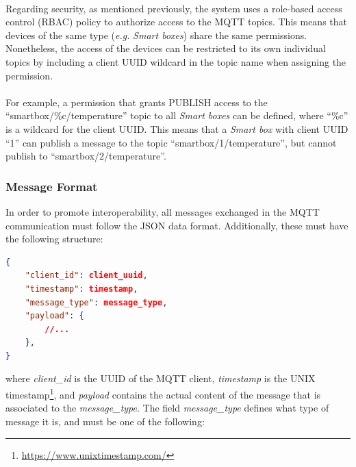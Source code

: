 \paragraph{} Regarding security, as mentioned previously, the system uses a role-based access control (\acs{RBAC}) policy to authorize access to the \acs{MQTT} topics. This means that devices of the same type (\textit{e.g.} \textit{Smart boxes}) share the same permissions. 
Nonetheless, the access of the devices can be restricted to its own individual topics by including a client \acs{UUID} wildcard in the topic name when assigning the permission.


\paragraph{} For example, a permission that grants PUBLISH access to the ``smartbox/\%c/temperature'' topic to all \textit{Smart boxes} can be defined, where ``\%c'' is a wildcard for the client \acs{UUID}. This means that a \textit{Smart box} with client \acs{UUID} ``1'' can publish a message to the topic ``smartbox/1/temperature'', but cannot publish to ``smartbox/2/temperature''.

\subsubsection{Message Format}
\label{sec:mqtt payload format}
In order to promote interoperability, all messages exchanged in the \acs{MQTT} communication must follow the \acs{JSON} data format. Additionally, these must have the following structure:

\begin{lstlisting}[language=json]
{
    "client_id": client_uuid, 
    "timestamp": timestamp,
    "message_type": message_type,
    "payload": {
        //...
    }, 
}  
\end{lstlisting}

where \textit{client\_id} is the \acs{UUID} of the \acs{MQTT} client, \textit{timestamp} is the UNIX timestamp\footnote{\url{https://www.unixtimestamp.com/}}, and \textit{payload} contains the actual content of the message that is associated to the \textit{message\_type}. The field \textit{message\_type} defines what type of message it is, and must be one of the following:

